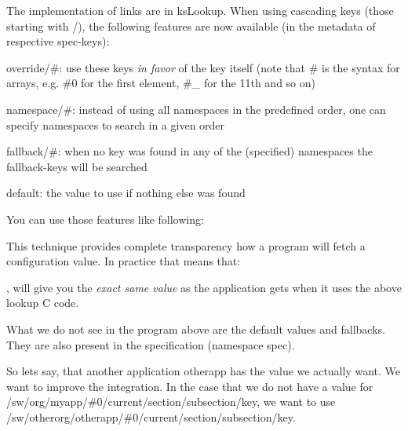 The implementation of links are in {\ttfamily ks\+Lookup}. When using cascading keys (those starting with {\ttfamily /}), the following features are now available (in the metadata of respective {\ttfamily spec}-\/keys)\+:


\begin{DoxyItemize}
\item {\ttfamily override/\#}\+: use these keys {\itshape in favor} of the key itself (note that {\ttfamily \#} is the syntax for arrays, e.\+g. {\ttfamily \#0} for the first element, {\ttfamily \#\+\_} for the 11th and so on)
\item {\ttfamily namespace/\#}\+: instead of using all namespaces in the predefined order, one can specify namespaces to search in a given order
\item {\ttfamily fallback/\#}\+: when no key was found in any of the (specified) namespaces the {\ttfamily fallback}-\/keys will be searched
\item {\ttfamily default}\+: the value to use if nothing else was found
\end{DoxyItemize}

You can use those features like following\+:


\begin{DoxyCode}{0}
\end{DoxyCode}


This technique provides complete transparency how a program will fetch a configuration value. In practice that means that\+:


\begin{DoxyCode}{0}
\end{DoxyCode}


, will give you the {\itshape exact same value} as the application gets when it uses the above lookup C code.

What we do not see in the program above are the default values and fallbacks. They are also present in the specification (namespace {\ttfamily spec}).

So lets say, that another application {\ttfamily otherapp} has the value we actually want. We want to improve the integration. In the case that we do not have a value for {\ttfamily /sw/org/myapp/\#0/current/section/subsection/key}, we want to use {\ttfamily /sw/otherorg/otherapp/\#0/current/section/subsection/key}.


